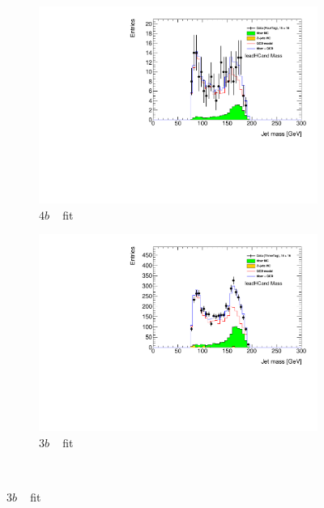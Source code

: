 \begin{figure}[htb!]
  \centering
  \captionsetup{justification=centering}
    \hspace{-4cm}
    \begin{subfigure}[b]{0.3\textwidth}
        \includegraphics[width=\textwidth,angle=-90]{figures/boosted/Fit/fitNorm_i4.pdf}
        \caption{$4b$ \mleadJ~ fit}
        \label{fig:ttbar-fit-4b}
    \end{subfigure}
    \quad \quad \quad \quad \quad
    \begin{subfigure}[b]{0.3\textwidth}
        \includegraphics[width=\textwidth,angle=-90]{figures/boosted/Fit/fitNorm_i3.pdf}
        \caption{$3b$ \mleadJ~ fit}
        \label{fig:ttbar-fit-3b}
    \end{subfigure}
    \\

\end{figure}
